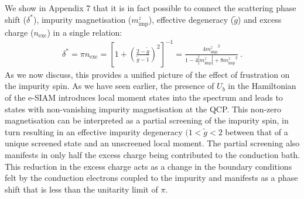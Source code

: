 We show in Appendix 7 that it is in fact  possible to connect the scattering phase shift ($\delta^{*}$), impurity magnetisation ($m_{\text{imp}}^{z}$), effective degeneracy ($\tilde{g}$) and excess charge ($n_{\text{exc}}$) in a single relation:
\begin{eqnarray}
	\delta^* = \pi n_\text{exc} = \left[1 + \left(\frac{2-\tilde g}{\tilde g-1}\right)^2\right]^{-1} = \frac{4{m_{\text{imp}}^z}^2}{1 - 4|m_{\text{imp}}^z| + 8{m_{\text{imp}}^z}^2}~.
\end{eqnarray}
As we now discuss, this provides a unified picture of the effect of frustration on the impurity spin. As we have seen earlier, the presence of \(U_b\) in the Hamiltonian of the e-SIAM introduces local moment states into the spectrum and leads to states with non-vanishing impurity magnetisation at the QCP. This non-zero magnetisation can be interpreted as a partial screening of the impurity spin, in turn resulting in an effective impurity degeneracy \((1 < \tilde g < 2\) between that of a unique screened state and an unscreened local moment. The partial screening also manifests in only half the excess charge being contributed to the conduction bath. This reduction in the excess charge acts as a change in the boundary conditions felt by the conduction electrons coupled to the impurity and manifests as a phase shift that is less than the unitarity limit of \(\pi\). 


